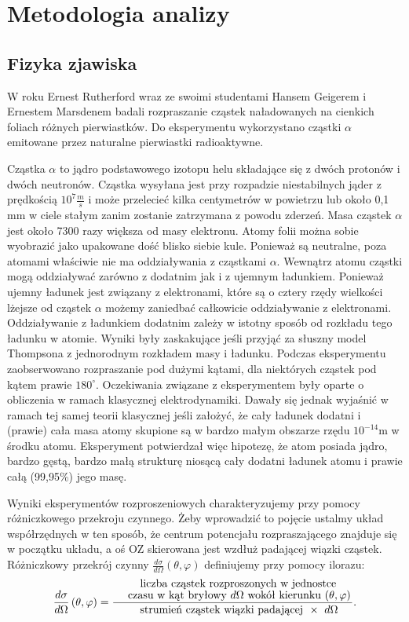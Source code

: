 \documentclass[11pt]{book}
\theoremstyle{definition}
\begin{document}
\chapter{Metodologia analizy}

\section{Fizyka zjawiska}

W roku Ernest Rutherford wraz ze swoimi studentami Hansem Geigerem i Ernestem Marsdenem badali rozpraszanie cząstek naładowanych na cienkich foliach różnych pierwiastków. Do eksperymentu wykorzystano cząstki $\alpha$ emitowane przez naturalne pierwiastki radioaktywne. 

Cząstka $\alpha$ to jądro podstawowego izotopu helu składające się z dwóch protonów i dwóch neutronów. Cząstka wysyłana jest przy rozpadzie niestabilnych jąder z prędkością $10^7 \frac{\si{m}}{\si{s}}$ i może przelecieć kilka centymetrów w powietrzu lub około 0,1 mm w ciele stałym zanim zostanie zatrzymana z powodu zderzeń. Masa cząstek $\alpha$ jest około 7300 razy większa od masy elektronu. Atomy folii można sobie wyobrazić jako upakowane dość blisko siebie kule. Ponieważ są neutralne, poza atomami właściwie nie ma oddziaływania z cząstkami $\alpha$. Wewnątrz atomu cząstki mogą oddziaływać zarówno z dodatnim jak i z ujemnym ładunkiem. Ponieważ ujemny ładunek jest
związany z elektronami, które są o cztery rzędy wielkości lżejsze od cząstek $\alpha$ możemy zaniedbać całkowicie oddziaływanie z elektronami. Oddziaływanie z ładunkiem dodatnim zależy w istotny sposób od rozkładu tego ładunku w atomie. 
Wyniki były zaskakujące jeśli przyjąć za słuszny model Thompsona z jednorodnym rozkładem masy i ładunku.  Podczas eksperymentu zaobserwowano rozpraszanie pod dużymi kątami, dla niektórych cząstek pod kątem prawie $180^{\circ}$. Oczekiwania związane z eksperymentem były oparte o obliczenia w ramach klasycznej elektrodynamiki. Dawały się jednak wyjaśnić w ramach tej samej teorii klasycznej jeśli założyć, że cały ładunek dodatni i (prawie) cała masa atomy skupione są w bardzo małym obszarze rzędu $10^{-14}$m w środku atomu. Eksperyment potwierdzał więc hipotezę, że atom posiada jądro, bardzo gęstą, bardzo małą strukturę niosącą cały dodatni ładunek atomu i prawie całą (99,95\%) jego masę.
%

Wyniki eksperymentów rozproszeniowych charakteryzujemy przy pomocy różniczkowego przekroju czynnego. Żeby wprowadzić to pojęcie ustalmy układ współrzędnych w ten sposób, że centrum potencjału rozpraszającego znajduje się w początku układu, a oś OZ skierowana jest wzdłuż padającej wiązki cząstek. Różniczkowy przekrój czynny $\frac{d\sigma}{d\Omega}\left(\theta, \varphi\right)$ definiujemy przy pomocy ilorazu:
\begin{equation}
\frac{d\sigma}{d\Omega}\left(\theta, \varphi\right) = \frac{\splitfrac{\text{ \;\;\;\;\;\; liczba cząstek rozproszonych w jednostce }}{\text {czasu w kąt bryłowy $d\Omega$ wokół kierunku $\left(\theta, \varphi\right)$}}}{\text{\;\;\; strumień cząstek wiązki padającej $\; \times \; \; d\Omega$}}.
\end{equation}
\end{document}

